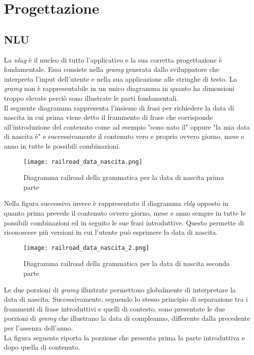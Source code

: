 \section{Progettazione}
	\subsection{NLU}
	La \emph{\gls{nlug}} è il nucleo di tutto l'applicativo e la sua corretta progettazione è fondamentale. Essa consiste nella \emph{\gls{gramg}} generata dallo sviluppatore che interpreta l'input dell'utente e nella sua applicazione alle stringhe di testo. La \emph{\gls{gramg}} non è rappresentabile in un unico diagramma  in quanto ha dimensioni troppo elevate perciò sono illustrate le parti fondamentali. \\
	Il seguente diagramma rappresenta l'insieme di frasi per richiedere la data di nascita in cui prima viene detto il frammento di frase che corrisponde all'introduzione del contenuto come ad esempio "sono nato il" oppure "la mia data di nascita è" e successivamente il contenuto vero e proprio ovvero giorno, mese e anno in tutte le possibili combinazioni. 
		
	\begin{figure}[htbp]
		\begin{center}
			\texttt{[image: railroad\_data\_nascita.png]}
			\caption{Diagramma railroad della grammatica per la data di nascita prima parte}
		\end{center}
	\end{figure}
	
	Nella figura successiva invece è rappresentato il diagramma \emph{\gls{rldg}} opposto in quanto prima prevede il contenuto ovvero giorno, mese e anno sempre in tutte le possibili combinazioni ed in seguito le sue frasi introduttive. Questo permette di riconoscere più versioni in cui l'utente può esprimere la data di nascita.
	
	\begin{figure}[htbp]
		\begin{center}
			\texttt{[image: railroad\_data\_nascita\_2.png]}
			\caption{Diagramma railroad della grammatica per la data di nascita seconda parte}
		\end{center}
	\end{figure}

	Le due porzioni di \emph{\gls{gramg}} illustrate permettono globalmente di interpretare la data di nascita. Successivamente, seguendo lo stesso principio di separazione tra i frammenti di frase introduttivi e quelli di contesto, sono presentate le due porzioni di \emph{\gls{gramg}} che illustrano la data di compleanno, differente dalla precedente per l'assenza dell'anno. \\
	La figura seguente riporta la porzione che presenta prima la parte introduttiva e dopo quella di contenuto.
	
